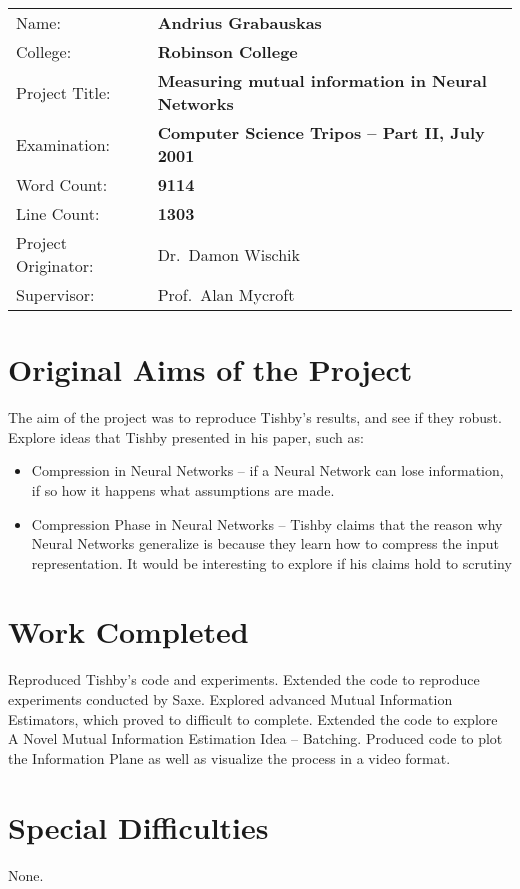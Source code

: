 \documentclass[dissertation.tex]{subfiles}
\begin{document}
{\large
\begin{tabular}{ll}
Name:               & \bf Andrius Grabauskas                    \\
College:            & \bf Robinson College                      \\
Project Title:      & \bf Measuring mutual information in Neural Networks \\
Examination:        & \bf Computer Science Tripos -- Part II, July 2001  \\
Word Count:         & \bf 9114\footnotemark[1] \\
Line Count:         & \bf 1303\footnotemark[2] \\
Project Originator: & Dr.\ Damon Wischik                  \\
Supervisor:         & Prof.\ Alan Mycroft                 \\ 
\end{tabular}
}


\section*{Original Aims of the Project}

The aim of the project was to reproduce Tishby's results, and see if they
robust. Explore ideas that Tishby presented in his paper, such as: 
\begin{itemize}
  \item{
      Compression in Neural Networks -- if a Neural Network can lose
      information, if so how it happens what assumptions are made.
    }
  \item{
      Compression Phase in Neural Networks -- Tishby claims that the reason why
      Neural Networks generalize is because they learn how to compress the input
      representation. It would be interesting to explore if his claims hold to
      scrutiny
    }
\end{itemize}

\section*{Work Completed}

Reproduced Tishby's code and experiments. Extended the code to reproduce
experiments conducted by Saxe. Explored advanced Mutual Information Estimators,
which proved to difficult to complete. Extended the code to explore A Novel
Mutual Information Estimation Idea -- Batching. Produced code to plot the
Information Plane as well as visualize the process in a video format.

\section*{Special Difficulties}

None.

\newpage
\end{document}
